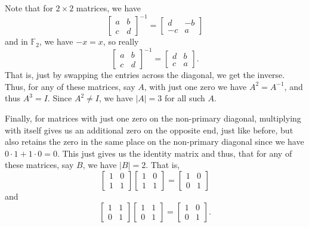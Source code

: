 \documentclass[12 pt, letterpaper]{hmcpset}
\begin{document}
\begin{solution}
	Note that for $2 \times 2$ matrices, we have
	\[
		\begin{bmatrix}
			a & b \\
			c & d
		\end{bmatrix}^{-1} = 
		\begin{bmatrix}
			d & -b \\
			-c & a
		\end{bmatrix}
	\]
	and in $\mathbb F_2$, we have $-x = x$, so really
	\[
		\begin{bmatrix}
			a & b \\
			c & d
		\end{bmatrix}^{-1} = 
		\begin{bmatrix}
			d & b \\
			c & a
		\end{bmatrix}.
	\]
	That is, just by swapping the entries across the diagonal, we get the inverse. Thus, for any of these matrices, say $A$, with just one zero we have $A^2 = A^{-1}$, and thus $A^3 = I$. Since $A^2 \neq I$, we have $\lvert A \rvert = 3$ for all such $A$. 

	Finally, for matrices with just one zero on the non-primary diagonal, multiplying with itself gives us an additional zero on the opposite end, just like before, but also retains the zero in the same place on the non-primary diagonal since we have $0 \cdot 1 + 1 \cdot 0 = 0$. This just gives us the identity matrix and thus, that for any of these matrices, say $B$, we have $\lvert B \rvert = 2$. That is,
	\[
		\begin{bmatrix}
			1 & 0 \\
			1 & 1
		\end{bmatrix}
		\begin{bmatrix}
			1 & 0 \\
			1 & 1
		\end{bmatrix} =
		\begin{bmatrix}
			1 & 0 \\
			0 & 1
		\end{bmatrix}
	\]
	and
	\[
		\begin{bmatrix}
			1 & 1 \\
			0 & 1
		\end{bmatrix}
		\begin{bmatrix}
			1 & 1 \\
			0 & 1
		\end{bmatrix} =
		\begin{bmatrix}
			1 & 0 \\
			0 & 1
		\end{bmatrix}.
	\]
\end{solution}
\end{document}
